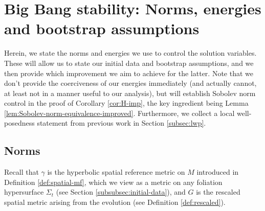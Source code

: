 \documentclass[11pt,leqno,textwidth=10cm]{amsart}
\numberwithin{equation}{section}
\theoremstyle{definition}
\theoremstyle{plain}
\newcommand{\1}{\mathbbm{1}}
\newcommand{\I}{\mathbb{I}}
\newcommand{\del}{\partial}
\begin{document}
%


\section{Big Bang stability: Norms, energies and bootstrap assumptions}\label{sec:norm-en-bs}

Herein, we state the norms and energies we use to control the solution variables. These will allow us to state our initial data and bootstrap assumptions, and we then provide which improvement we aim to achieve for the latter. Note that we don't provide the coerciveness of our energies immediately (and actually cannot, at least not in a manner useful to our analysis), but will establish Sobolev norm control in the proof of Corollary \ref{cor:H-imp}, the key ingredient being Lemma \ref{lem:Sobolev-norm-equivalence-improved}. Furthermore, we collect a local well-posedness statement from previous work in Section \ref{subsec:lwp}.

\subsection{Norms}\label{subsec:norm}

Recall that $\gamma$ is the hyperbolic spatial reference metric on $M$ introduced in Definition \ref{def:spatial-mf}, which we view as a metric on any foliation hypersurface $\Sigma_t$ (see Section \ref{subsubsec:initial-data}), and $G$ is the rescaled spatial metric arising from the evolution (see Definition \ref{def:rescaled}).
\end{document}
